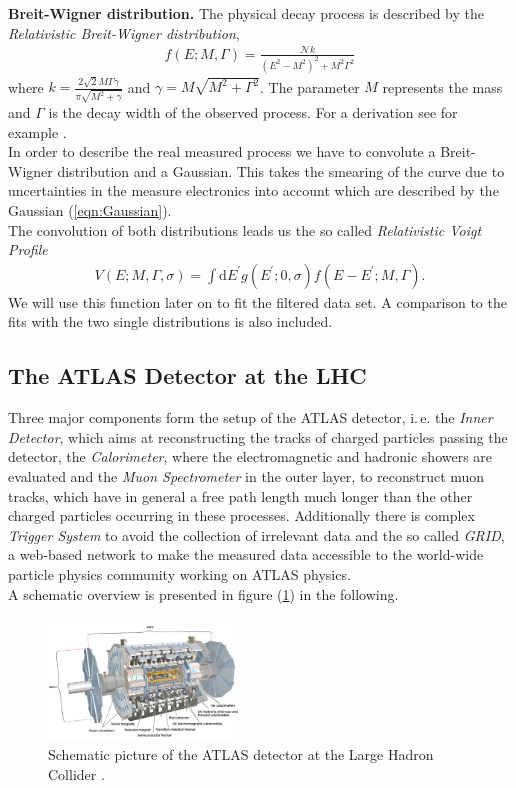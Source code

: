 \documentclass[twocolumn,
			   showpacs,%
               nofootinbib,
               aps,%
               prd,
               notitlepage,
               showkeys,
               10pt]{revtex4-1}
\begin{document}
\textbf{Breit-Wigner distribution.} The physical decay process is described by the \textit{Relativistic Breit-Wigner distribution}, 
\begin{align}
	f(E ; M, \Gamma)=\frac{\mathcal{N} k}{\left(E^{2}-M^{2}\right)^{2}+M^{2} \Gamma^{2}}
\end{align}
where $k=\frac{2 \sqrt{2} M \Gamma \gamma}{\pi \sqrt{M^{2}+\gamma}}$ and $\gamma=M \sqrt{M^{2}+\Gamma^{2}}$. The parameter $M$ represents the mass and $\Gamma$ is the decay width of the observed process. For a derivation see for example \cite{BohmSato2004}. \\

In order to describe the real measured process we have to convolute a Breit-Wigner distribution and a Gaussian. This takes the smearing of the curve due to uncertainties in the measure electronics into account which are described by the Gaussian (\ref{eqn:Gaussian}). \\

The convolution of both distributions leads us the so called \textit{Relativistic Voigt Profile}
\begin{align}
	V(E ; M, \Gamma, \sigma)=\int \mathrm{d} E^{\prime} g\left(E^{\prime} ; 0, \sigma\right) f\left(E-E^{\prime} ; M, \Gamma\right).
\end{align}
We will use this function later on to fit the filtered data set. A comparison to the fits with the two single distributions is also included. 
\subsection{The ATLAS Detector at the LHC}

Three major components form the setup of the ATLAS detector, i.\,e. the \textit{Inner Detector}, which aims at reconstructing the tracks of charged particles passing the detector, the \textit{Calorimeter}, where the electromagnetic and hadronic showers are evaluated and the \textit{Muon Spectrometer} in the outer layer, to reconstruct muon tracks, which have in general a free path length much longer than the other charged particles occurring in these processes. Additionally there is complex \textit{Trigger System} to avoid the collection of irrelevant data and the so called \textit{GRID}, a web-based network to make the measured data accessible to the world-wide particle physics community working on ATLAS physics. \\
A schematic overview is presented in figure (\ref{fig:atlas}) in the following.
\begin{figure}[H]
\centering
\includegraphics[width=0.45\textwidth]{figures/introduction/atlas}
\caption[Schematic picture of the ATLAS detector at the LHC.]{Schematic picture of the ATLAS detector at the Large Hadron Collider \cite{ATLAS}.}
\label{fig:atlas}
\end{figure}
\end{document}
